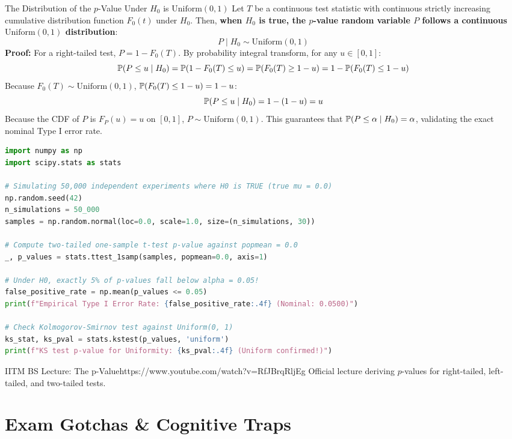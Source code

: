 \begin{theorembox}{The Distribution of the $p$-Value Under $H_0$ is $\text{Uniform}(0, 1)$}
Let $T$ be a continuous test statistic with continuous strictly increasing cumulative distribution function $F_0(t)$ under $H_0$. 
Then, \textbf{when $H_0$ is true, the $p$-value random variable $P$ follows a continuous $\text{Uniform}(0, 1)$ distribution}:
$$P \mid H_0 \sim \text{Uniform}(0, 1)$$
\textbf{Proof:}
For a right-tailed test, $P = 1 - F_0(T)$. By probability integral transform, for any $u \in [0, 1]$:
$$\P(P \le u \mid H_0) = \P(1 - F_0(T) \le u) = \P(F_0(T) \ge 1 - u) = 1 - \P(F_0(T) \le 1 - u)$$
Because $F_0(T) \sim \text{Uniform}(0, 1)$, $\P(F_0(T) \le 1 - u) = 1 - u$:
$$\P(P \le u \mid H_0) = 1 - (1 - u) = u$$
Because the CDF of $P$ is $F_P(u) = u$ on $[0, 1]$, $P \sim \text{Uniform}(0, 1)$. 
This guarantees that $\P(P \le \alpha \mid H_0) = \alpha$, validating the exact nominal Type I error rate.
\end{theorembox}

\begin{lstlisting}[language=Python, caption=Data Science: Verifying that p-values are Uniform under H0]
import numpy as np
import scipy.stats as stats

# Simulating 50,000 independent experiments where H0 is TRUE (true mu = 0.0)
np.random.seed(42)
n_simulations = 50_000
samples = np.random.normal(loc=0.0, scale=1.0, size=(n_simulations, 30))

# Compute two-tailed one-sample t-test p-value against popmean = 0.0
_, p_values = stats.ttest_1samp(samples, popmean=0.0, axis=1)

# Under H0, exactly 5% of p-values fall below alpha = 0.05!
false_positive_rate = np.mean(p_values <= 0.05)
print(f"Empirical Type I Error Rate: {false_positive_rate:.4f} (Nominal: 0.0500)")

# Check Kolmogorov-Smirnov test against Uniform(0, 1)
ks_stat, ks_pval = stats.kstest(p_values, 'uniform')
print(f"KS test p-value for Uniformity: {ks_pval:.4f} (Uniform confirmed!)")
\end{lstlisting}

\begin{videocard}{IITM BS Lecture: The p-Value}{https://www.youtube.com/watch?v=RfJBrqRljEg}
Official lecture deriving $p$-values for right-tailed, left-tailed, and two-tailed tests.
\end{videocard}

\section{Exam Gotchas \& Cognitive Traps}

